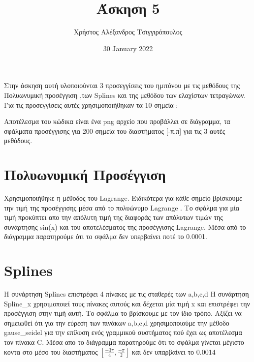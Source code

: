 \documentclass{article}
\title{Άσκηση 5}
\author{Χρήστος Αλέξανδρος Τσιγγιρόπουλος}
\date{30 January 2022}
\begin{document}
    \maketitle
    Στην άσκηση αυτή υλοποιούνται 3 προσεγγίσεις του ημιτόνου με τις μεθόδους της 
Πολυωνυμική προσέγγιση ,των Splines και της μεθόδου των ελαχίστων τετραγώνων. 
Για τις προσεγγίσεις αυτές χρησιμοποιήθηκαν τα 10 σημεία :

    \begin{equation*}
        [-\pi, \frac{-3\pi}{4}, \frac{-\pi}{2}, \frac{-\pi}{3}, \frac{-\pi}{6}, 0, \frac{\pi}{4},\frac{\pi}{2}, \frac{3\pi}{4}, \pi]
    \end{equation*}
    Αποτέλεσμα του κώδικα είναι ένα png αρχείο που προβάλλει σε διάγραμμα,
    τα σφάλματα προσέγγισης για 200 σημεία του διαστήματος [-π,π] για τις 3 αυτές μεθόδους.
    
    \section{Πολυωνυμική Προσέγγιση}
    
    Χρησιμοποιήθηκε η μέθοδος του Lagrange. Ειδικότερα για κάθε σημείο βρίσκουμε την τιμή της προσέγγισης μέσα από το πολυώνυμο Lagrange . Το σφάλμα για μία τιμή προκύπτει απο την απόλυτη τιμή της διαφοράς των απόλυτων τιμών της συνάρτησης sin(x) και του αποτελέσματος της προσέγγισης Lagrange. Μέσα από το διάγραμμα παρατηρούμε ότι το σφάλμα δεν υπερβαίνει ποτέ το 0.0001.  
    
    \section{Splines}
    
    Η συνάρτηση Splines επιστρέφει 4 πίνακες με τις
    σταθερές των a,b,c,d
    Η συνάρτηση Spline\_x χρησιμοποιεί τους πίνακες αυτούς και
    δέχεται μία τιμή x και επιστρέφει την προσέγγιση στην τιμή 
    αυτή.
    Το σφάλμα το βρίσκουμε με τον ίδιο τρόπο. 
    Αξίζει να σημειωθεί ότι για την εύρεση των πινάκων a,b,c,d
    χρησιμοποιούμε την μέθοδο gause\_seidel για την επίλυση ενός 
    γραμμικού συστήματος πού έχει ως αποτέλεσμα τον πίνακα C.
    Μέσα απο το διάγραμμα παρατηρούμε ότι το σφάλμα γίνεται 
    μέγιστο κοντα στο μέσο του διαστήματος $[\frac{-3\pi}{4}, \frac{-\pi}{2}]$ 
    και δεν υπαρβαίνει το 0.0014
    
\end{document}
